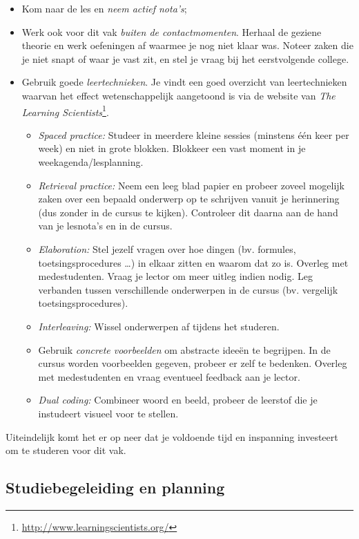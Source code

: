 \begin{itemize}
  \item Kom naar de les en \emph{neem actief nota's};
  \item Werk ook voor dit vak \emph{buiten de contactmomenten}. Herhaal de geziene theorie en werk oefeningen af waarmee je nog niet klaar was. Noteer zaken die je niet snapt of waar je vast zit, en stel je vraag bij het eerstvolgende college.
  \item Gebruik goede \emph{leertechnieken}. Je vindt een goed overzicht van leertechnieken waarvan het effect wetenschappelijk aangetoond is via de website van \emph{The Learning Scientists}\footnote{\url{http://www.learningscientists.org/}}.
  \begin{itemize}
    \item \emph{Spaced practice:} Studeer in meerdere kleine sessies (minstens één keer per week) en niet in grote blokken. Blokkeer een vast moment in je weekagenda/lesplanning.
    \item \emph{Retrieval practice:} Neem een leeg blad papier en probeer zoveel mogelijk zaken over een bepaald onderwerp op te schrijven vanuit je herinnering (dus zonder in de cursus te kijken). Controleer dit daarna aan de hand van je lesnota's en in de cursus.
    \item \emph{Elaboration:} Stel jezelf vragen over hoe dingen (bv. formules, toetsingsprocedures \ldots) in elkaar zitten en waarom dat zo is. Overleg met medestudenten. Vraag je lector om meer uitleg indien nodig. Leg verbanden tussen verschillende onderwerpen in de cursus (bv. vergelijk toetsingsprocedures).
    \item \emph{Interleaving:} Wissel onderwerpen af tijdens het studeren.
    \item Gebruik \emph{concrete voorbeelden} om abstracte ideeën te begrijpen. In de cursus worden voorbeelden gegeven, probeer er zelf te bedenken. Overleg met medestudenten en vraag eventueel feedback aan je lector.
    \item \emph{Dual coding:} Combineer woord en beeld, probeer de leerstof die je instudeert visueel voor te stellen.
  \end{itemize}
\end{itemize}

Uiteindelijk komt het er op neer dat je voldoende tijd en inspanning investeert om te studeren voor dit vak.

\subsection{Studiebegeleiding en planning}

